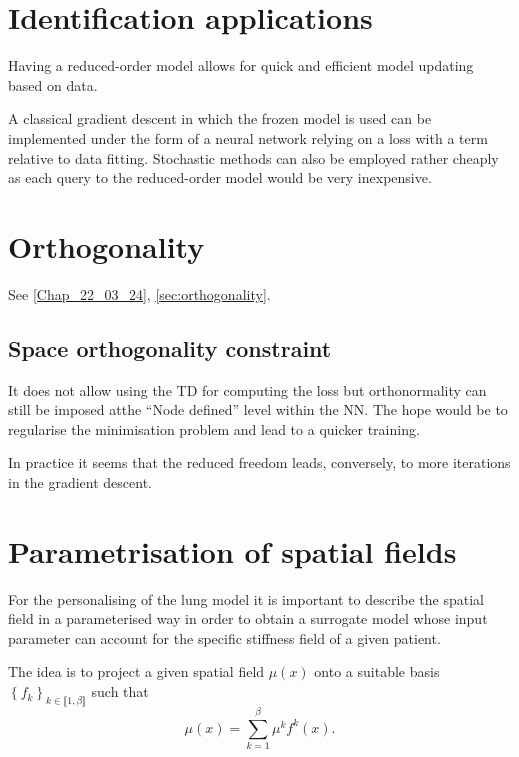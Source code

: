 
\section{Identification applications}

Having a reduced-order model allows for quick and efficient model updating based on data. 

A classical gradient descent in which the frozen model is used can be implemented under the form of a neural network relying on a loss with a term relative to data fitting. Stochastic methods can also be employed rather cheaply as each query to the reduced-order model would be very inexpensive. 


\section{Orthogonality}
See \cref{Chap_22_03_24}, \cref{sec:orthogonality}.
\subsection{Space orthogonality constraint}
It does not allow using the TD for computing the loss but orthonormality can still be imposed atthe ``Node defined'' level within the NN. The hope would be to regularise the minimisation problem and lead to a quicker training. 

In practice it seems that the reduced freedom leads, conversely, to more iterations in the gradient descent. 


\section{Parametrisation of spatial fields}

For the personalising of the lung model it is important to describe the spatial field in a parameterised way in order to obtain a surrogate model whose input parameter can account for the specific stiffness field of a given patient.

The idea is to project a given spatial field $\mu\left(x\right)$ onto a suitable basis $\left\{f_k\right\}_{k \in \llbracket 1, \beta \rrbracket}$ such that 
\begin{equation}
    \mu\left(x\right) = \sum\limits_{k=1}^{\beta}\mu^{k}f^k\left(x\right).
\end{equation}

